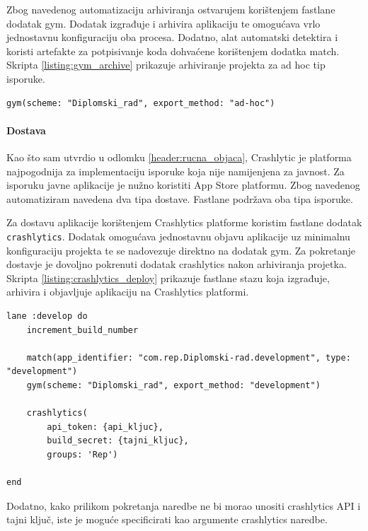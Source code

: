 \documentclass[times, utf8, diplomski, numeric]{fer}
\begin{document}
\begin{appendices}
Zbog navedenog automatizaciju arhiviranja ostvarujem korištenjem fastlane dodatak gym. Dodatak izgrađuje i arhivira aplikaciju te omogućava vrlo jednostavnu konfiguraciju oba procesa. Dodatno, alat automatski detektira i koristi artefakte za potpisivanje koda dohvaćene korištenjem dodatka match. Skripta \ref{listing:gym_archive} prikazuje arhiviranje projekta za ad hoc tip isporuke.

\begin{lstlisting}[caption=Arhiviranje aplikacije za ad hoc isporuku pomoću dodatka gym, label=listing:gym_archive]
gym(scheme: "Diplomski_rad", export_method: "ad-hoc")
\end{lstlisting}

\paragraph{Dostava}

Kao što sam utvrdio u odlomku \ref{header:rucna_objaca}, Crashlytic je platforma najpogodnija za implementaciju isporuke koja nije namijenjena za javnost. Za isporuku javne aplikacije je nužno koristiti App Store platformu. Zbog navedenog automatiziram navedena dva tipa dostave. Fastlane podržava oba tipa isporuke.

Za dostavu aplikacije korištenjem Crashlytics platforme koristim fastlane dodatak \verb|crashlytics|. Dodatak omogućava jednostavnu objavu aplikacije uz minimalnu konfiguraciju projekta te se nadovezuje direktno na dodatak gym. Za pokretanje dostavje je dovoljno pokrenuti dodatak crashlytics nakon arhiviranja projetka. Skripta \ref{listing:crashlytics_deploy} prikazuje fastlane stazu koja izgrađuje, arhivira i objavljuje aplikaciju na Crashlytics platformi.

\begin{lstlisting}[caption=Fastlane staza za isporuku korištenjem Crashlytics platforme, label=listing:crashlytics_deploy]
lane :develop do
    increment_build_number

    match(app_identifier: "com.rep.Diplomski-rad.development", type: "development")
    gym(scheme: "Diplomski_rad", export_method: "development")

    crashlytics(
        api_token: {api_kljuc},
        build_secret: {tajni_kljuc},
        groups: 'Rep')

end
\end{lstlisting}

Dodatno, kako prilikom pokretanja naredbe ne bi morao unositi crashlytics API i tajni ključ, iste je moguće specificirati kao argumente crashlytics naredbe.


\end{appendices}
\end{document}
